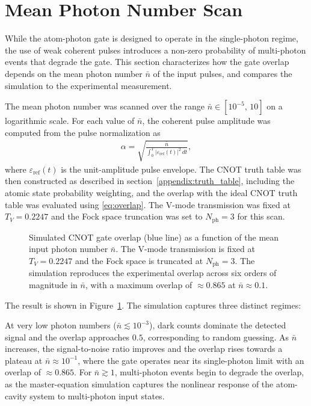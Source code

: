 \section{Mean Photon Number Scan}\label{appendix:photon_number_scan}

While the atom-photon gate is designed to operate in the single-photon regime, the use of weak coherent pulses introduces a non-zero probability of multi-photon events that degrade the gate. This section characterizes how the gate overlap depends on the mean photon number $\bar{n}$ of the input pulses, and compares the simulation to the experimental measurement.

The mean photon number was scanned over the range $\bar{n} \in [10^{-5},\, 10]$ on a logarithmic scale. For each value of $\bar{n}$, the coherent pulse amplitude was computed from the pulse normalization as
\begin{align}
	\alpha = \sqrt{\frac{\bar{n}}{\int_0^T |\varepsilon_{\text{ref}}(t)|^2\, dt}},
\end{align}
where $\varepsilon_{\text{ref}}(t)$ is the unit-amplitude pulse envelope. The CNOT truth table was then constructed as described in section~\ref{appendix:truth_table}, including the atomic state probability weighting, and the overlap with the ideal CNOT truth table was evaluated using \eqref{eq:overlap}. The V-mode transmission was fixed at $T_V = 0.2247$ and the Fock space truncation was set to $N_{\text{ph}} = 3$ for this scan.

\begin{figure}[htpb]
	\centering
	
	\caption{Simulated CNOT gate overlap (blue line) as a function of the mean input photon number $\bar{n}$. The V-mode transmission is fixed at $T_V = 0.2247$ and the Fock space is truncated at $N_{\text{ph}} = 3$. The simulation reproduces the experimental overlap across six orders of magnitude in $\bar{n}$, with a maximum overlap of $\approx 0.865$ at $\bar{n} \approx 0.1$.}
	\label{fig:photon_number_scan}
\end{figure}

The result is shown in Figure~\ref{fig:photon_number_scan}. The simulation captures three distinct regimes:

At very low photon numbers ($\bar{n} \lesssim 10^{-3}$), dark counts dominate the detected signal and the overlap approaches $0.5$, corresponding to random guessing. As $\bar{n}$ increases, the signal-to-noise ratio improves and the overlap rises towards a plateau at $\bar{n} \approx 10^{-1}$, where the gate operates near its single-photon limit with an overlap of $\approx 0.865$.
For $\bar{n} \gtrsim 1$, multi-photon events begin to degrade the overlap, as the master-equation simulation captures the nonlinear response of the atom-cavity system to multi-photon input states.

